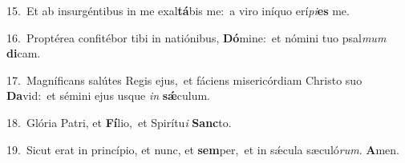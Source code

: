{\numbfont\textcolor{\numbcolor}{15.}}~Et ab insurgéntibus in me exal\-\textbf{tá}\-bis me:~\star a viro iníquo erí\-\textit{pi}\-\textbf{es} me.\par
{\numbfont\textcolor{\numbcolor}{16.}}~Proptérea confitébor tibi in natiónibus, \textbf{Dó}\-mine:~\star et nómini tuo psal\textit{mum} \textbf{di}\-cam.\par
{\numbfont\textcolor{\numbcolor}{17.}}~Magníficans salútes Regis ejus,~\dagger et fáciens misericórdiam Christo suo \textbf{Da}\-vid:~\star et sémini ejus usque \textit{in} \textbf{sǽ}\-culum.\par
{\numbfont\textcolor{\numbcolor}{18.}}~Glória Patri, et \textbf{Fí}\-lio,~\star et Spirítu\textit{i} \textbf{Sanc}\-to.\par
{\numbfont\textcolor{\numbcolor}{19.}}~Sicut erat in princípio, et nunc, et \textbf{sem}\-per,~\star et in sǽcula sæculó\-\textit{rum}\-. \textbf{A}\-men.\par
